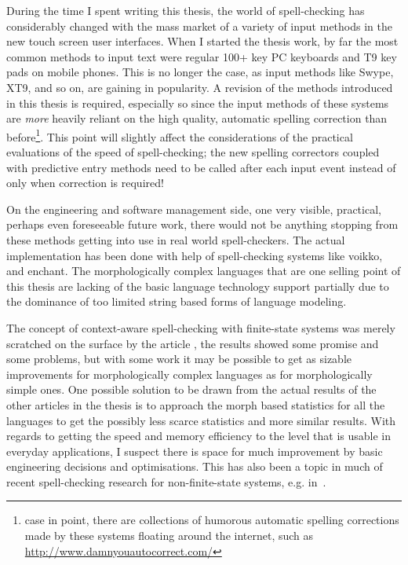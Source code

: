 \documentclass[officiallayout,draft]{unihelcompling}
\begin{document}
During the time I spent writing this thesis, the world of spell-checking has
considerably changed with the mass market of a variety of input methods in the
new touch screen user interfaces. When I started the thesis work, by far the
most common methods to input text were regular 100+ key PC keyboards and T9 key
pads on mobile phones. This is no longer the case, as input methods like Swype,
XT9, and so on, are gaining in popularity. A revision of the methods introduced
in this thesis is required, especially so since the input methods of these
systems are \emph{more} heavily reliant on the high quality, automatic spelling
correction than before\footnote{case in point, there are collections of
    humorous automatic spelling corrections made by these systems floating
around the internet, such as \url{http://www.damnyouautocorrect.com/}}. This
point will slightly affect the considerations of the practical evaluations of
the speed of spell-checking; the new spelling correctors coupled with
predictive entry methods need to be called after each input event instead of
only when correction is required!

On the engineering and software management side, one very visible, practical,
perhaps even foreseeable future work, there would not be anything stopping from
these methods getting into use in real world spell-checkers. The actual
implementation has been done with help of spell-checking systems like voikko,
and enchant. The morphologically complex languages that are one selling point
of this thesis are lacking of the basic language technology support partially
due to the dominance of too limited string based forms of language modeling.

The concept of context-aware spell-checking with finite-state systems was
merely scratched on the surface by the article
, the results showed some promise and some
problems, but with some work it may be possible to get as sizable improvements
for morphologically complex languages as for morphologically simple ones. One
possible solution to be drawn from the actual results of the other articles in
the thesis is to approach the morph based statistics for all the languages to
get the possibly less scarce statistics and more similar results. With regards
to getting the speed and memory efficiency to the level that is usable in
everyday applications, I suspect there is space for much improvement by basic
engineering decisions and optimisations. This has also been a topic in much of
recent spell-checking research for non-finite-state systems, e.g.
in~\citep{carlson2001scaling}.
\end{document}
